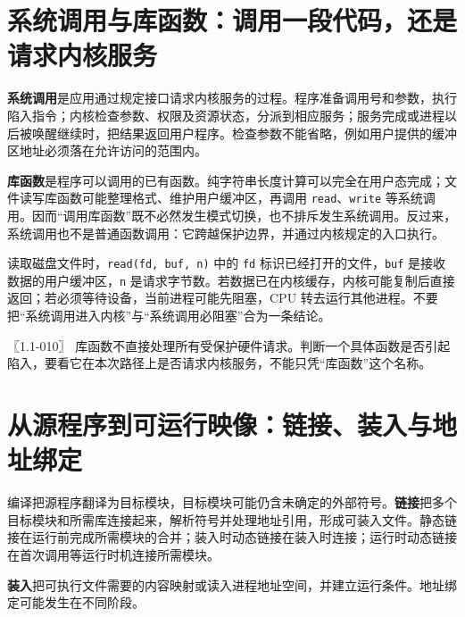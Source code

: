 \section{系统调用与库函数：调用一段代码，还是请求内核服务}\label{os-1-5}

\textbf{系统调用}是应用通过规定接口请求内核服务的过程。程序准备调用号和参数，执行陷入指令；内核检查参数、权限及资源状态，分派到相应服务；服务完成或进程以后被唤醒继续时，把结果返回用户程序。检查参数不能省略，例如用户提供的缓冲区地址必须落在允许访问的范围内。

\textbf{库函数}是程序可以调用的已有函数。纯字符串长度计算可以完全在用户态完成；文件读写库函数可能整理格式、维护用户缓冲区，再调用 \texttt{read}、\texttt{write} 等系统调用。因而``调用库函数''既不必然发生模式切换，也不排斥发生系统调用。反过来，系统调用也不是普通函数调用：它跨越保护边界，并通过内核规定的入口执行。

读取磁盘文件时，\texttt{read(fd,}\allowbreak{}\texttt{\ buf,}\allowbreak{}\texttt{\ n)} 中的 \texttt{fd} 标识已经打开的文件，\texttt{buf} 是接收数据的用户缓冲区，\texttt{n} 是请求字节数。若数据已在内核缓存，内核可能复制后直接返回；若必须等待设备，当前进程可能先阻塞，CPU 转去运行其他进程。不要把``系统调用进入内核''与``系统调用必阻塞''合为一条结论。

\noindent{}〖1.1-010〗 库函数不直接处理所有受保护硬件请求。判断一个具体函数是否引起陷入，要看它在本次路径上是否请求内核服务，不能只凭``库函数''这个名称。

\section{从源程序到可运行映像：链接、装入与地址绑定}\label{os-1-6}

编译把源程序翻译为目标模块，目标模块可能仍含未确定的外部符号。\textbf{链接}把多个目标模块和所需库连接起来，解析符号并处理地址引用，形成可装入文件。静态链接在运行前完成所需模块的合并；装入时动态链接在装入时连接；运行时动态链接在首次调用等运行时机连接所需模块。

\textbf{装入}把可执行文件需要的内容映射或读入进程地址空间，并建立运行条件。地址绑定可能发生在不同阶段。


